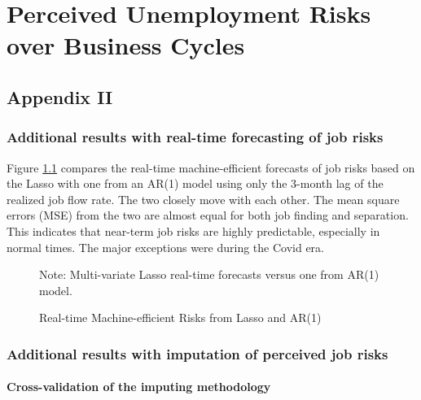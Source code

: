 \chapter{Perceived Unemployment Risks over Business Cycles}
\label{append:two}

\pagebreak 


\section{Appendix II}


\subsection{Additional results with real-time forecasting of job risks}
\label{appendix:real_time_results_more}


Figure \ref{fig:real_time_ar} compares the real-time machine-efficient forecasts of job risks based on the Lasso with one from an AR(1) model using only the 3-month lag of the realized job flow rate. The two closely move with each other. The mean square errors (MSE) from the two are almost equal for both job finding and separation. This indicates that near-term job risks are highly predictable, especially in normal times. The major exceptions were during the Covid era. 

 \begin{figure}[ht]
    	\caption{Real-time Machine-efficient Risks from Lasso and AR(1)}
    	\label{fig:real_time_ar}
    	\begin{center}
    	\end{center}
    	
    	\begin{flushleft}\footnotesize{Note: Multi-variate Lasso real-time forecasts versus one from AR(1) model.}\end{flushleft}
    \end{figure}


\subsection{Additional results with imputation of perceived job risks}



\subsubsection{Cross-validation of the imputing methodology}

